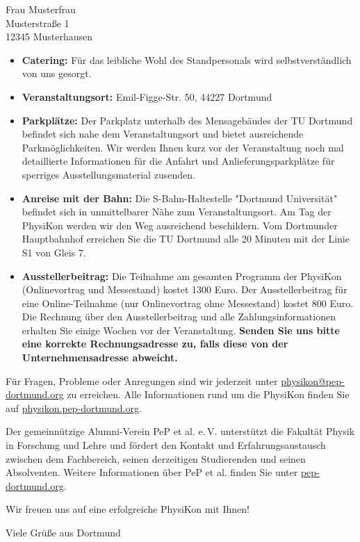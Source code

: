 \documentclass[
  pepbrief,
  fontsize=12pt,
  paper=a4,
  DIV=14,
  parskip=half,
  backaddress=false,
]{scrlttr2}
\begin{document}
\begin{letter}{%
  Frau Musterfrau \\
  Musterstraße 1 \\
  12345 Musterhausen
}
\begin{itemize}
    aktuell sind, werden wir Sie einige Wochen vor der Veranstaltung bitten, uns Stellenangebote zuzusenden. 
    Sie können die Jobbörse aber auch gerne schon vorab nutzen, wenn sie aktuelle Stellenausschreibungen haben.
    Unsere Jobbörse ist unabhängig von der PhysiKon immer online.
    \item \textbf{Catering:} Für das leibliche Wohl des Standpersonals wird selbstverständlich von uns gesorgt.
    \item \textbf{Veranstaltungsort:} Emil-Figge-Str. 50, 44227 Dortmund
    \item \textbf{Parkplätze:} Der Parkplatz unterhalb des Mensagebäudes der TU Dortmund befindet sich nahe dem Veranstaltungsort und bietet  
    ausreichende Parkmöglichkeiten. Wir werden Ihnen kurz vor der Veranstaltung noch mal detaillierte Informationen für die Anfahrt und Anlieferungsparkplätze für sperriges Ausstellungsmaterial zusenden. 
    \item \textbf{Anreise mit der Bahn:} Die S-Bahn-Haltestelle "Dortmund Universität" befindet sich in unmittelbarer Nähe zum Veranstaltungsort.
    Am Tag der PhysiKon werden wir den Weg ausreichend beschildern.
    Vom Dortmunder Hauptbahnhof erreichen Sie die TU Dortmund alle 20 Minuten mit der Linie S1 von Gleis 7.
    \item \textbf{Ausstellerbeitrag:} Die Teilnahme am gesamten Programm der PhysiKon (Onlinevortrag und Messestand) kostet 1300 Euro.
    Der Ausstellerbeitrag für eine Online-Teilnahme (nur Onlinevortrag ohne Messestand) kostet 800 Euro.
    Die Rechnung über den Ausstellerbeitrag und alle Zahlungsinformationen erhalten Sie einige Wochen vor der Veranstaltung.
    \textbf{Senden Sie uns bitte eine korrekte Rechnungsadresse zu, falls diese von der Unternehmensadresse abweicht.}
\end{itemize}

Für Fragen, Probleme oder Anregungen sind wir jederzeit unter \href{mailto:physikon@pep-dortmund.org}{physikon@pep-dortmund.org} zu erreichen. 
Alle Informationen rund um die PhysiKon finden Sie auf \href{https://physikon.pep-dortmund.org/}{physikon.pep-dortmund.org}.

Der gemeinnützige Alumni-Verein PeP et al. e.\,V. unterstützt die Fakultät Physik in Forschung und Lehre und fördert den Kontakt und Erfahrungsaustausch zwischen dem Fachbereich,
seinen derzeitigen Studierenden und seinen Absolventen.
Weitere Informationen über PeP et al. finden Sie unter
\href{https://pep-dortmund.org/}{pep-dortmund.org}.

Wir freuen uns auf eine erfolgreiche PhysiKon mit Ihnen!

\closing{Viele Grüße aus Dortmund}

\end{letter}
\end{document}
